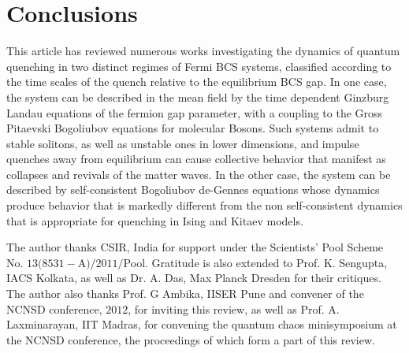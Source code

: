 \documentclass[aps,pra,floats,epsfig,pdflatex]{revtex4}                                                              %
\begin{document}
\section{\sc Conclusions}
\label{sec:concl}
 {This article has reviewed  numerous works investigating the dynamics of quantum quenching in two distinct regimes of Fermi BCS systems, classified according to the time scales of the quench relative to the equilibrium BCS gap. In one case, the system can be described in the mean field by the time dependent Ginzburg Landau equations of the fermion gap parameter, with a coupling to the Gross Pitaevski Bogoliubov equations for molecular Bosons. Such systems admit to stable solitons, as well as unstable ones in lower dimensions, and impulse quenches away from equilibrium can cause collective behavior that manifest as collapses and revivals of the matter waves. In the other case, the system can be described by self-consistent Bogoliubov de-Gennes equations whose dynamics produce behavior that is markedly different from the non self-consistent dynamics that is appropriate for quenching in Ising and Kitaev models. 

The author thanks CSIR, India for support under the Scientists' Pool Scheme No. $13(8531-$A$)/2011/$Pool. Gratitude is also extended to Prof. K. Sengupta, IACS Kolkata, as well as Dr. A. Das, Max Planck Dresden for their critiques. The author also thanks Prof. G Ambika, IISER Pune and convener of the NCNSD conference, $2012$, for inviting this review, as well as Prof. A. Laxminarayan, IIT Madras, for convening the quantum chaos minisymposium at the NCNSD conference, the proceedings of which form a part of this review.}
\end{document}
